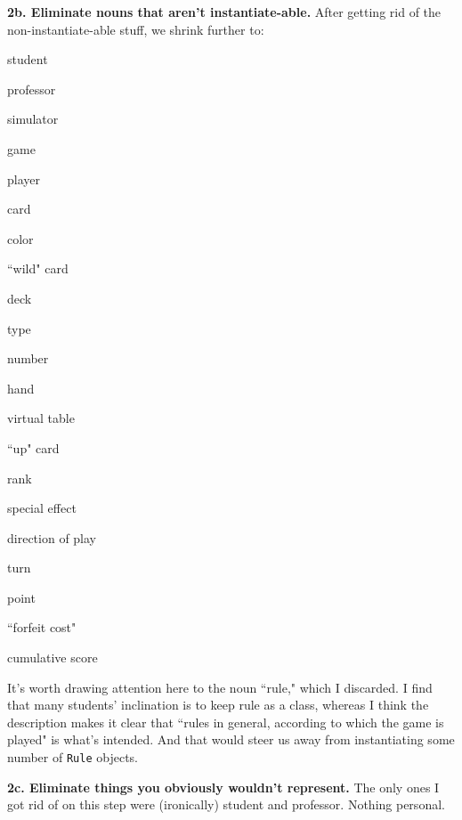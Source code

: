 \vspace{.1in}
\textbf{2b. Eliminate nouns that aren't instantiate-able.} After getting rid
of the non-instantiate-able stuff, we shrink further to:

\begin{samepage}
\begin{multicols}{3}
\small
\begin{compactitem}
\renewcommand\labelitemi{\raisebox{0.25ex}{\tiny$\bullet$}}
\item \textsf{student}
\item \textsf{professor}
\item \textsf{simulator}
\item \textsf{game}
\item \textsf{player}
\item \textsf{card}
\item \textsf{color}
\columnbreak
\item \textsf{``wild" card}
\item \textsf{deck}
\item \textsf{type}
\item \textsf{number}
\item \textsf{hand}
\item \textsf{virtual table}
\item \textsf{``up" card}
\columnbreak
\item \textsf{rank}
\item \textsf{special effect}
\item \textsf{direction of play}
\item \textsf{turn}
\item \textsf{point}
\item \textsf{``forfeit cost"}
\item \textsf{cumulative score}
\end{compactitem}
\end{multicols}
\end{samepage}

It's worth drawing attention here to the noun ``\textsf{rule}," which I
discarded. I find that many students' inclination is to keep \textsf{rule} as
a class, whereas I think the description makes it clear that ``rules in
general, according to which the game is played" is what's intended. And that
would steer us away from instantiating some number of \texttt{Rule} objects.

\vspace{.1in}
\pagebreak
\textbf{2c. Eliminate things you obviously wouldn't represent.} The only ones
I got rid of on this step were (ironically) \textsf{student} and
\textsf{professor}. Nothing personal.

